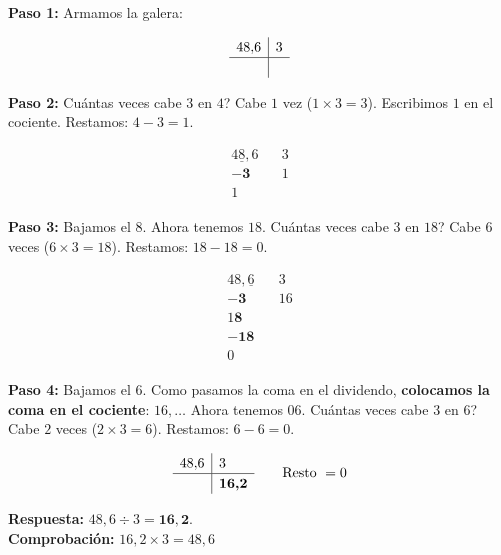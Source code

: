 \documentclass[12pt, letterpaper]{article}
\begin{document}
\begin{cuadrosolucion}
  \textbf{Paso 1:} Armamos la galera:

  \[
    \renewcommand{\arraystretch}{1.2}
    \begin{array}{r|l}
      48{,}6 & 3 \\ \hline
             &
    \end{array}
  \]

  \textbf{Paso 2:} \textquestiondown Cuántas veces cabe $3$ en $4$? Cabe $1$ vez ($1 \times 3 = 3$). Escribimos $1$ en el cociente. Restamos: $4 - 3 = 1$.

  \[
    \renewcommand{\arraystretch}{1.2}
    \begin{array}{r|l}
      4\underline{8}{,}6         & 3 \\ \hline
      \mathbf{-3}\phantom{8{,}6} & 1 \\
      1\phantom{8{,}6}           &
    \end{array}
  \]

  \textbf{Paso 3:} Bajamos el $8$. Ahora tenemos $18$. \textquestiondown Cuántas veces cabe $3$ en $18$? Cabe $6$ veces ($6 \times 3 = 18$). Restamos: $18 - 18 = 0$.

  \[
    \renewcommand{\arraystretch}{1.2}
    \begin{array}{r|l}
      48{,}\underline{6}         & 3  \\ \hline
      \mathbf{-3}\phantom{8{,}6} & 16 \\
      1\mathbf{8}\phantom{{,}6}  &    \\
      \mathbf{-18}\phantom{{,}6} &    \\
      0\phantom{{,}6}            &
    \end{array}
  \]

  \textbf{Paso 4:} Bajamos el $6$. Como pasamos la coma en el dividendo, \textbf{colocamos la coma en el cociente}: $16{,}\ldots$ Ahora tenemos $06$. \textquestiondown Cuántas veces cabe $3$ en $6$? Cabe $2$ veces ($2 \times 3 = 6$). Restamos: $6 - 6 = 0$.

  \[
    \renewcommand{\arraystretch}{1.2}
    \begin{array}{r|l}
      48{,}6 & 3                   \\ \hline
             & \boldsymbol{16{,}2} \\
    \end{array}
    \qquad \text{Resto } = 0
  \]

  \textbf{Respuesta:} $48{,}6 \div 3 = \boldsymbol{16{,}2}$.\\
  \textbf{Comprobación:} $16{,}2 \times 3 = 48{,}6$ \checkmark
\end{cuadrosolucion}
\end{document}
